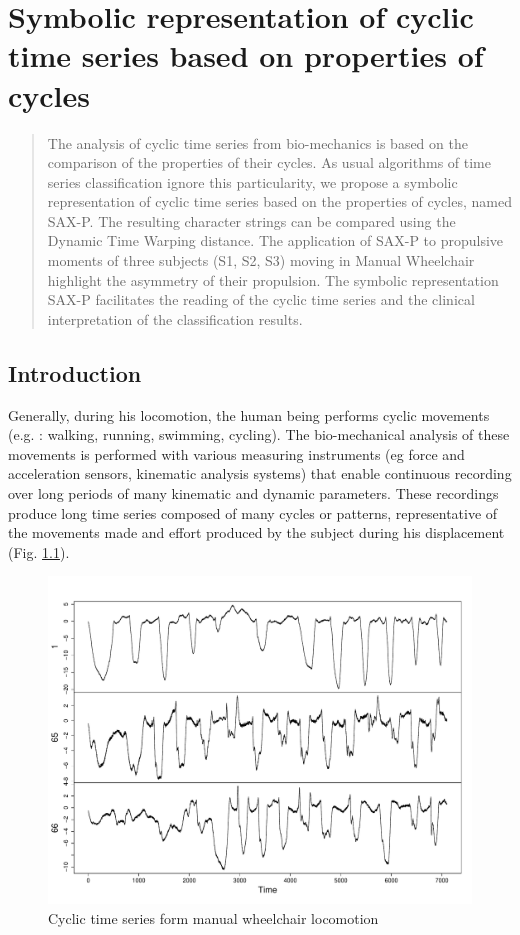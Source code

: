 \chapter[SAX-P]{Symbolic representation of cyclic time series based on properties of cycles}
\label{chapter_saxp}
\begin{abstract} 
The analysis of cyclic time series from bio-mechanics is based on the
comparison of the properties of their cycles. As usual algorithms of time 
series classification ignore this particularity, we propose
a symbolic representation of cyclic time series based on the properties
of cycles, named SAX-P. The resulting character strings can be compared
using the Dynamic Time Warping distance. The application of SAX-P
to propulsive moments of three subjects (S1, S2, S3) moving in Manual
Wheelchair highlight the asymmetry of their propulsion. The symbolic representation 
SAX-P facilitates the reading of
the cyclic time series and the clinical interpretation of the classification results.

\end{abstract} 

\section{Introduction}
\label{introduction}

Generally, during his locomotion, the human being performs cyclic movements (e.g. : walking, running, swimming,
cycling). The bio-mechanical analysis of these movements is performed with various measuring instruments 
(eg force and acceleration sensors, kinematic analysis systems) that enable continuous recording over 
long periods of many kinematic and dynamic parameters. These recordings produce long
time series composed of many cycles or patterns, representative of the movements made and effort 
produced by the subject during his displacement (Fig. \ref{fig:cyclicTS}).


 \begin{figure}[h]
  \centering
   \includegraphics[scale=0.4]{images/sax-p/cycliqueTS}
    \caption{Cyclic time series form manual wheelchair locomotion}
  \label{fig:cyclicTS}
  \end{figure}


